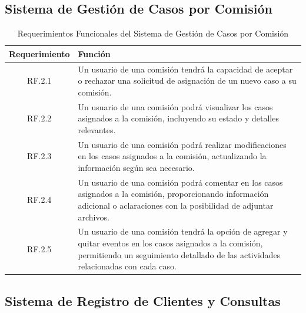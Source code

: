 \subsection{Sistema de Gestión de Casos por Comisión}
\begin{table}[H]
    \centering
    \begin{tabular}{|c|p{10cm}|}
        \hline
        \textbf{Requerimiento} & \textbf{Función} \\
        \hline
        RF.2.1 & Un usuario de una comisión tendrá la capacidad de aceptar o rechazar una solicitud de asignación de un nuevo caso a su comisión. \\
        \hline
        RF.2.2 & Un usuario de una comisión podrá visualizar los casos asignados a la comisión, incluyendo su estado y detalles relevantes. \\
        \hline
        RF.2.3 & Un usuario de una comisión podrá realizar modificaciones en los casos asignados a la comisión, actualizando la información según sea necesario. \\
        \hline
        RF.2.4 & Un usuario de una comisión podrá comentar en los casos asignados a la comisión, proporcionando información adicional o aclaraciones con la posibilidad de adjuntar archivos. \\
        \hline
        RF.2.5 & Un usuario de una comisión tendrá la opción de agregar y quitar eventos en los casos asignados a la comisión, permitiendo un seguimiento detallado de las actividades relacionadas con cada caso. \\
        \hline
    \end{tabular}
    \caption{Requerimientos Funcionales del Sistema de Gestión de Casos por Comisión}
    \label{tab:rf-gestion-casos-comision}
\end{table}

\subsection{Sistema de Registro de Clientes y Consultas}

